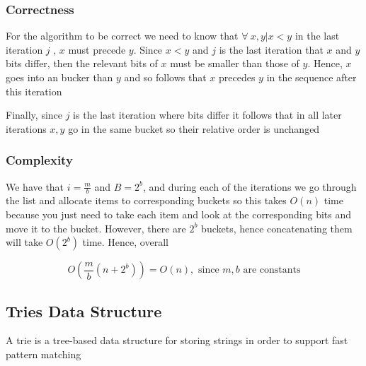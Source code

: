 		\newpage

		\subsubsection{Correctness}

			\par{For the algorithm to be correct we need to know that $\forall \ x,y | x <y$ in the last iteration $j$ , $x$ must precede $y$. Since $x < y$ and $j$ is the last iteration that $x$ and $y$ bits differ, then the relevant bits of $x$ must be smaller than those of $y$. Hence, $x$ goes into an  bucker than $y$ and so follows that $x$ precedes $y$ in the sequence after this iteration}
			\par{Finally, since $j$ is the last iteration where bits differ it follows that in all later iterations $x,y$ go in the same bucket so their relative order is unchanged}



		\subsubsection{Complexity}

			\par{We have that $i = \frac{m}{b}$ and $B = 2^b$, and during each of the iterations we go through the list and allocate items to corresponding buckets so this takes $O(n)$ time because you just need to take each item and look at the corresponding bits and move it to the bucket. However, there are $2^b$ buckets, hence concatenating them will take $O(2^b)$ time. Hence, overall}

			$$O(\frac{m}{b} (n+2^b)) = O(n) , \text{  since $m,b$ are constants}$$





	\subsection{Tries Data Structure}

		\par{A trie is a tree-based data structure for storing strings in order to support fast pattern matching}




